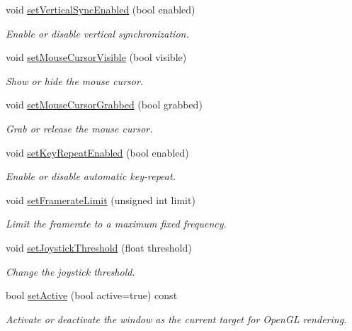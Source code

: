 \begin{DoxyCompactItemize}
void \hyperlink{classsf_1_1_window_a59041c4556e0351048f8aff366034f61}{set\+Vertical\+Sync\+Enabled} (bool enabled)
\begin{DoxyCompactList}\small\item\em Enable or disable vertical synchronization. \end{DoxyCompactList}\item 
void \hyperlink{classsf_1_1_window_aad3991c25e0a83afbb4d62febf9b7b14}{set\+Mouse\+Cursor\+Visible} (bool visible)
\begin{DoxyCompactList}\small\item\em Show or hide the mouse cursor. \end{DoxyCompactList}\item 
void \hyperlink{classsf_1_1_window_a5b4ef8ede77531e17b7a0287fa6ff9ce}{set\+Mouse\+Cursor\+Grabbed} (bool grabbed)
\begin{DoxyCompactList}\small\item\em Grab or release the mouse cursor. \end{DoxyCompactList}\item 
void \hyperlink{classsf_1_1_window_aef9f2b14c10ecba8a8df95dd51c5bb73}{set\+Key\+Repeat\+Enabled} (bool enabled)
\begin{DoxyCompactList}\small\item\em Enable or disable automatic key-\/repeat. \end{DoxyCompactList}\item 
void \hyperlink{classsf_1_1_window_af4322d315baf93405bf0d5087ad5e784}{set\+Framerate\+Limit} (unsigned int limit)
\begin{DoxyCompactList}\small\item\em Limit the framerate to a maximum fixed frequency. \end{DoxyCompactList}\item 
void \hyperlink{classsf_1_1_window_aa45b8f54e29a6f59f1fc7ee66b2fab68}{set\+Joystick\+Threshold} (float threshold)
\begin{DoxyCompactList}\small\item\em Change the joystick threshold. \end{DoxyCompactList}\item 
bool \hyperlink{classsf_1_1_window_aaab549da64cedf74fa6f1ae7a3cc79e0}{set\+Active} (bool active=true) const
\begin{DoxyCompactList}\small\item\em Activate or deactivate the window as the current target for Open\+GL rendering. \end{DoxyCompactList}\item 

\end{DoxyCompactItemize}
